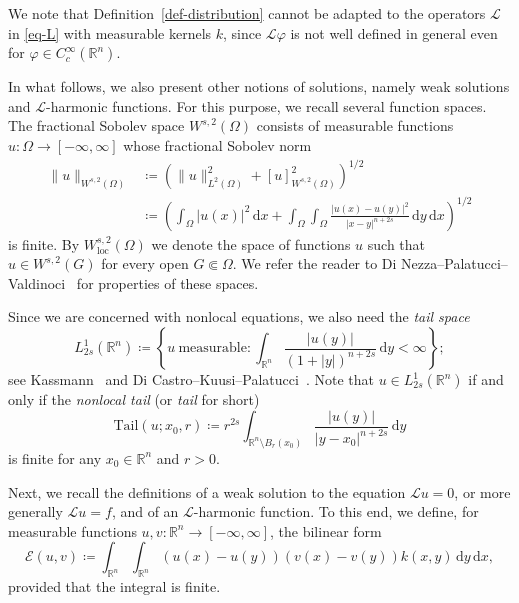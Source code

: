 \documentclass[11pt]{amsart}
\theoremstyle{plain}
\theoremstyle{definition}
\numberwithin{equation}{section}
\begin{document}
We note that Definition~\ref{def-distribution} cannot be adapted to the operators $\mathcal{L}$ in \eqref{eq-L} with measurable kernels $k$, since $\mathcal{L}\varphi$ is not well defined in general even for $\varphi \in C^\infty_c(\mathbb{R}^n)$.

In what follows, we also present other notions of solutions, namely weak solutions and $\mathcal{L}$-harmonic functions. For this purpose, we recall several function spaces. The fractional Sobolev space $W^{s, 2}(\Omega)$ consists of measurable functions $u: \Omega \to [-\infty, \infty]$ whose fractional Sobolev norm
\begin{align*}
\|u\|_{W^{s, 2}(\Omega)}
&\coloneqq \left( \|u\|_{L^2(\Omega)}^2 + [u]_{W^{s, 2}(\Omega)}^2 \right)^{1/2} \\
&\coloneqq \left( \int_\Omega |u(x)|^2 \,\mathrm{d}x + \int_\Omega \int_\Omega \frac{|u(x)-u(y)|^2}{|x-y|^{n+2s}} \,\mathrm{d}y\,\mathrm{d}x \right)^{1/2}
\end{align*}
is finite. By $W^{s, 2}_{\mathrm{loc}}(\Omega)$ we denote the space of functions $u$ such that $u \in W^{s, 2}(G)$ for every open $G \Subset \Omega$. We refer the reader to Di Nezza--Palatucci--Valdinoci~\cite{DNPV12} for properties of these spaces.

Since we are concerned with nonlocal equations, we also need the \emph{tail space}
\begin{equation*}
L^{1}_{2s}(\mathbb{R}^n) \coloneqq \left\{ u~\text{measurable}: \int_{\mathbb{R}^n} \frac{|u(y)|}{(1+|y|)^{n+2s}} \,\mathrm{d}y < \infty \right\};
\end{equation*}
see Kassmann~\cite{Kas11} and Di Castro--Kuusi--Palatucci~\cite{DCKP16}. Note that $u \in L^{1}_{2s}(\mathbb{R}^n)$ if and only if the \emph{nonlocal tail} (or \emph{tail} for short)
\begin{equation}\label{eq-tail}
\mathrm{Tail}(u; x_0, r) \coloneqq r^{2s} \int_{\mathbb{R}^n \setminus B_r(x_0)} \frac{|u(y)|}{|y-x_0|^{n+2s}} \,\mathrm{d}y
\end{equation}
is finite for any $x_0 \in \mathbb{R}^n$ and $r>0$.

Next, we recall the definitions of a weak solution to the equation $\mathcal{L}u=0$, or more generally $\mathcal{L}u=f$, and of an $\mathcal{L}$-harmonic function. To this end, we define, for measurable functions $u, v: \mathbb{R}^n \to [-\infty, \infty]$, the bilinear form
\begin{equation*}
\mathcal{E}(u,v)\coloneqq\int_{\mathbb{R}^n} \int_{\mathbb{R}^n} (u(x)-u(y))(v(x)-v(y)) k(x, y) \,\mathrm{d}y\,\mathrm{d}x,
\end{equation*}
provided that the integral is finite.
\end{document}

